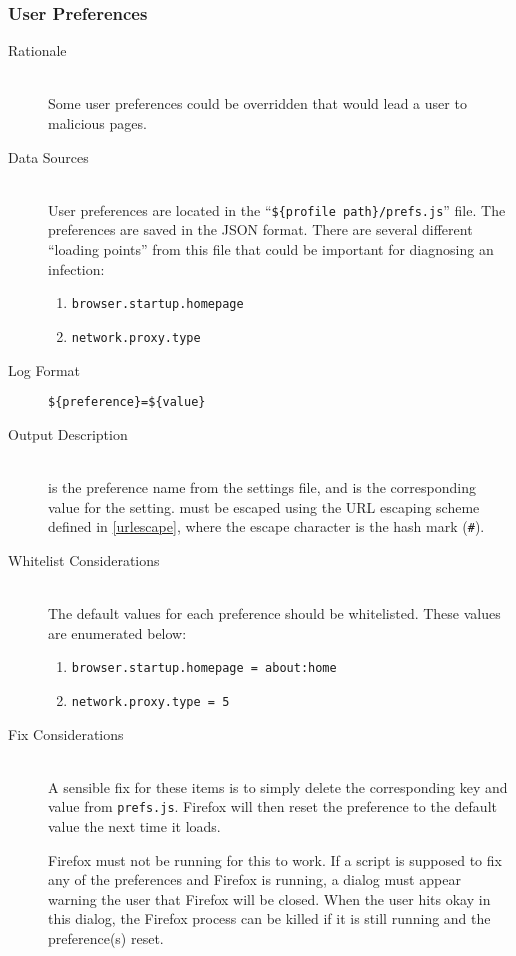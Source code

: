 \subsubsection{User Preferences}
\begin{description}
\item[Rationale] \hfill \\
Some user preferences could be overridden that would lead a user to malicious
pages.  
\item[Data Sources] \hfill \\
User preferences are located in the ``\verb|${profile path}/prefs.js|'' file. 
The preferences are saved in the JSON format. There are several different
``loading points'' from this file that could be important for diagnosing an
infection:
\begin{enumerate}
  \item \verb|browser.startup.homepage|
  \item \verb|network.proxy.type|
\end{enumerate}
\item[Log Format] \hfill 
\vspace{-\baselineskip}
\begin{verbatim}
${preference}=${value}
\end{verbatim}
\item[Output Description] \hfill \\
 is the preference name from the settings file, and 
is the corresponding value for the setting.   must be escaped using
the URL escaping scheme defined in \ref{urlescape}, where the escape character
is the hash mark (\verb|#|).
\item[Whitelist Considerations] \hfill \\
The default values for each preference should be whitelisted.  These values are
enumerated below:
\begin{enumerate}
  \item \verb|browser.startup.homepage = about:home|
  \item \verb|network.proxy.type = 5|
\end{enumerate}

\item[Fix Considerations] \hfill \\
A sensible fix for these items is to simply delete the corresponding key and
value from \verb|prefs.js|.  Firefox will then reset the preference to the
default value the next time it loads.

Firefox must not be running for this to work.  If a script is supposed to fix
any of the preferences and Firefox is running, a dialog must appear warning the
user that Firefox will be closed.  When the user hits okay in this dialog, the
Firefox process can be killed if it is still running and the preference(s)
reset.
\end{description}

